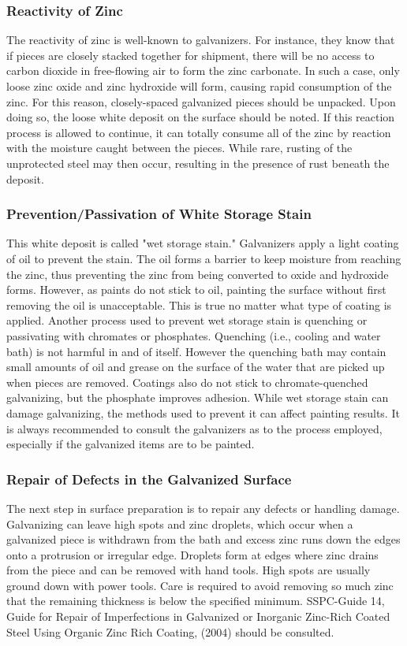 \subsubsection{Reactivity of Zinc}
The reactivity of zinc is well-known to galvanizers. For instance, they know that if pieces are closely stacked
together for shipment, there will be no access to carbon dioxide in free-flowing air to form the zinc carbonate. In
such a case, only loose zinc oxide and zinc hydroxide will form, causing rapid consumption of the zinc. For this
reason, closely-spaced galvanized pieces should be unpacked. Upon doing so, the loose white deposit on the surface
should be noted. If this reaction process is allowed to continue, it can totally consume all of the zinc by reaction with
the moisture caught between the pieces. While rare, rusting of the unprotected steel may then occur, resulting in the
presence of rust beneath the deposit.

\subsubsection{Prevention/Passivation of White Storage Stain}
This white deposit is called "wet storage stain." Galvanizers apply a light coating of oil to prevent the stain. The
oil forms a barrier to keep moisture from reaching the zinc, thus preventing the zinc from being converted to oxide
and hydroxide forms. However, as paints do not stick to oil, painting the surface without first removing the oil is
unacceptable. This is true no matter what type of coating is applied. Another process used to prevent wet storage
stain is quenching or passivating with chromates or phosphates. Quenching (i.e., cooling and water bath) is not
harmful in and of itself. However the quenching bath may contain small amounts of oil and grease on the surface of
the water that are picked up when pieces are removed. Coatings also do not stick to chromate-quenched galvanizing,
but the phosphate improves adhesion. While wet storage stain can damage galvanizing, the methods used to prevent
it can affect painting results. It is always recommended to consult the galvanizers as to the process employed,
especially if the galvanized items are to be painted.

\subsubsection{Repair of Defects in the Galvanized Surface}
The next step in surface preparation is to repair any defects or handling damage. Galvanizing can leave high
spots and zinc droplets, which occur when a galvanized piece is withdrawn from the bath and excess zinc runs down
the edges onto a protrusion or irregular edge. Droplets form at edges where zinc drains from the piece and can be
removed with hand tools. High spots are usually ground down with power tools. Care is required to avoid removing so much zinc that the remaining thickness is below the specified minimum. SSPC-Guide 14, Guide for Repair of
Imperfections in Galvanized or Inorganic Zinc-Rich Coated Steel Using Organic Zinc Rich Coating, (2004) should
be consulted.

